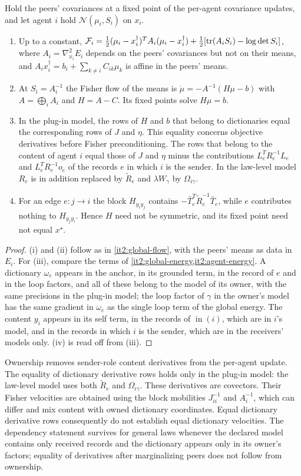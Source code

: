 \documentclass[11pt,letterpaper]{report}
\newcommand{\inn}{\operatorname{in}}
\begin{document}
Hold the peers' covariances at a fixed point of the per-agent covariance updates, and let agent $i$ hold $\mathcal N(\mu_i,S_i)$ on $x_i$.
\begin{enumerate}
\item[(i)] Up to a constant, $\mathcal F_i=\frac12(\mu_i-x_i^\dagger)^TA_i(\mu_i-x_i^\dagger)+\frac12[\operatorname{tr}(A_iS_i)-\log\det S_i]$, where $A_i=\nabla^2_{x_i}E_i$ depends on the peers' covariances but not on their means, and $A_ix_i^\dagger=b_i+\sum_{k\neq i}C_{ik}\mu_k$ is affine in the peers' means.
\item[(ii)] At $S_i=A_i^{-1}$ the Fisher flow of the means is $\dot\mu=-A^{-1}(H\mu-b)$ with $A=\bigoplus_iA_i$ and $H=A-C$. Its fixed points solve $H\mu=b$.
\item[(iii)] In the plug-in model, the rows of $H$ and $b$ that belong to dictionaries equal the corresponding rows of $J$ and $\eta$. This equality concerns objective derivatives before Fisher preconditioning. The rows that belong to the content of agent $i$ equal those of $J$ and $\eta$ minus the contributions $L_e^TR_e^{-1}L_e$ and $L_e^TR_e^{-1}o_e$ of the records $e$ in which $i$ is the sender. In the law-level model $R_e$ is in addition replaced by $\tilde R_e$ and $\lambda W_\gamma$ by $\Omega_{i\gamma}$.
\item[(iv)] For an edge $e:j\to i$ the block $H_{y_iy_j}$ contains $-\bar T_e^T\tilde R_e^{-1}\bar T_e$, while $e$ contributes nothing to $H_{y_jy_i}$. Hence $H$ need not be symmetric, and its fixed point need not equal $x^\star$.
\end{enumerate}
\begin{proof}
(i) and (ii) follow as in \cref{it2:global-flow}, with the peers' means as data in $E_i$. For (iii), compare the terms of \cref{it2:global-energy,it2:agent-energy}. A dictionary $\omega_e$ appears in the anchor, in its grounded term, in the record of $e$ and in the loop factors, and all of these belong to the model of its owner, with the same precisions in the plug-in model; the loop factor of $\gamma$ in the owner's model has the same gradient in $\omega_e$ as the single loop term of the global energy. The content $y_i$ appears in its self term, in the records of $\inn(i)$, which are in $i$'s model, and in the records in which $i$ is the sender, which are in the receivers' models only. (iv) is read off from (iii).
\end{proof}

Ownership removes sender-role content derivatives from the per-agent update. The equality of dictionary derivative rows holds only in the plug-in model: the law-level model uses both $\tilde R_e$ and $\Omega_{i\gamma}$. These derivatives are covectors. Their Fisher velocities are obtained using the block mobilities $J_{ii}^{-1}$ and $A_i^{-1}$, which can differ and mix content with owned dictionary coordinates. Equal dictionary derivative rows consequently do not establish equal dictionary velocities. The dependency statement survives for general laws whenever the declared model contains only received records and the dictionary appears only in its owner's factors; equality of derivatives after marginalizing peers does not follow from ownership.
\end{document}
